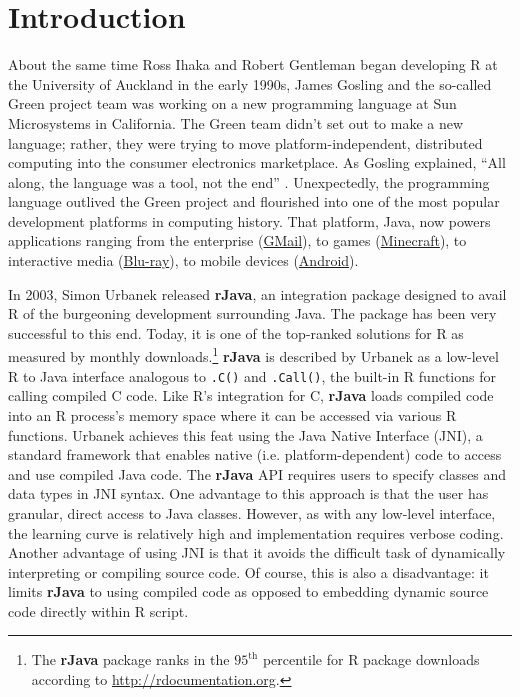 
\chapter{Introduction}

About the same time Ross Ihaka and Robert Gentleman began developing R at the University of Auckland in the early 1990s, James Gosling and the so-called Green project team was working on a new programming language at Sun Microsystems in California. The Green team didn't set out to make a new language; rather, they were trying to move platform-independent, distributed computing into the consumer electronics marketplace. As Gosling explained, ``All along, the language was a tool, not the end'' \citep{javainsidestory}. Unexpectedly, the programming language outlived the Green project and flourished into one of the most popular development platforms in computing history. That platform, Java, now powers applications ranging from the enterprise (\href{https://www.google.com/gmail/about/}{GMail}), to games (\href{https://minecraft.net}{Minecraft}), to interactive media (\href{https://en.wikipedia.org/wiki/Blu-ray}{Blu-ray}), to mobile devices (\href{https://www.android.com/}{Android}).

In 2003, Simon Urbanek released \textbf{rJava}, an integration package designed to avail R of the burgeoning development surrounding Java. The package has been very successful to this end. Today, it is one of the top-ranked solutions for R as measured by monthly downloads.\footnote{The \textbf{rJava} package ranks in the $95^{\text{th}}$ percentile for R package downloads according to \href{http://rdocumentation.org}{http://rdocumentation.org}.} \textbf{rJava} is described by Urbanek as a low-level R to Java interface analogous to \texttt{.C()} and \texttt{.Call()}, the built-in R functions for calling compiled C code. Like R's integration for C, \textbf{rJava} loads compiled code into an R process's memory space where it can be accessed via various R functions. Urbanek achieves this feat using the Java Native Interface (JNI), a standard framework that enables native (i.e. platform-dependent) code to access and use compiled Java code. The \textbf{rJava} API requires users to specify classes and data types in JNI syntax. One advantage to this approach is that the user has granular, direct access to Java classes. However, as with any low-level interface, the learning curve is relatively high and implementation requires verbose coding. Another advantage of using JNI is that it avoids the difficult task of dynamically interpreting or compiling source code. Of course, this is also a disadvantage: it limits \textbf{rJava} to using compiled code as opposed to embedding dynamic source code directly within R script.

